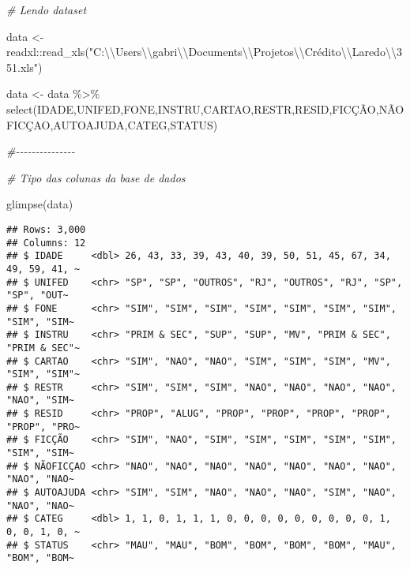 \documentclass[
]{book}
\newenvironment{Shaded}{\begin{snugshade}}{\end{snugshade}}
\newcommand{\CommentTok}[1]{\textcolor[rgb]{0.56,0.35,0.01}{\textit{#1}}}
\newcommand{\FunctionTok}[1]{\textcolor[rgb]{0.00,0.00,0.00}{#1}}
\newcommand{\NormalTok}[1]{#1}
\newcommand{\OtherTok}[1]{\textcolor[rgb]{0.56,0.35,0.01}{#1}}
\newcommand{\SpecialCharTok}[1]{\textcolor[rgb]{0.00,0.00,0.00}{#1}}
\newcommand{\StringTok}[1]{\textcolor[rgb]{0.31,0.60,0.02}{#1}}
\begin{document}
\begin{Shaded}
\begin{Highlighting}[]
\CommentTok{\# Lendo dataset}

\NormalTok{data }\OtherTok{\textless{}{-}}\NormalTok{ readxl}\SpecialCharTok{::}\FunctionTok{read\_xls}\NormalTok{(}\StringTok{"C:}\SpecialCharTok{\textbackslash{}\textbackslash{}}\StringTok{Users}\SpecialCharTok{\textbackslash{}\textbackslash{}}\StringTok{gabri}\SpecialCharTok{\textbackslash{}\textbackslash{}}\StringTok{Documents}\SpecialCharTok{\textbackslash{}\textbackslash{}}\StringTok{Projetos}\SpecialCharTok{\textbackslash{}\textbackslash{}}\StringTok{Crédito}\SpecialCharTok{\textbackslash{}\textbackslash{}}\StringTok{Laredo}\SpecialCharTok{\textbackslash{}\textbackslash{}}\StringTok{351.xls"}\NormalTok{)}

\NormalTok{data }\OtherTok{\textless{}{-}}\NormalTok{ data }\SpecialCharTok{\%\textgreater{}\%}
\FunctionTok{select}\NormalTok{(IDADE,UNIFED,FONE,INSTRU,CARTAO,RESTR,RESID,FICÇÃO,NÃOFICÇAO,AUTOAJUDA,CATEG,STATUS)}

\CommentTok{\#{-}{-}{-}{-}{-}{-}{-}{-}{-}{-}{-}{-}{-}{-}{-}}

\CommentTok{\# Tipo das colunas da base de dados}

\FunctionTok{glimpse}\NormalTok{(data)}
\end{Highlighting}
\end{Shaded}

\begin{verbatim}
## Rows: 3,000
## Columns: 12
## $ IDADE     <dbl> 26, 43, 33, 39, 43, 40, 39, 50, 51, 45, 67, 34, 49, 59, 41, ~
## $ UNIFED    <chr> "SP", "SP", "OUTROS", "RJ", "OUTROS", "RJ", "SP", "SP", "OUT~
## $ FONE      <chr> "SIM", "SIM", "SIM", "SIM", "SIM", "SIM", "SIM", "SIM", "SIM~
## $ INSTRU    <chr> "PRIM & SEC", "SUP", "SUP", "MV", "PRIM & SEC", "PRIM & SEC"~
## $ CARTAO    <chr> "SIM", "NAO", "NAO", "SIM", "SIM", "SIM", "MV", "SIM", "SIM"~
## $ RESTR     <chr> "SIM", "SIM", "SIM", "NAO", "NAO", "NAO", "NAO", "NAO", "SIM~
## $ RESID     <chr> "PROP", "ALUG", "PROP", "PROP", "PROP", "PROP", "PROP", "PRO~
## $ FICÇÃO    <chr> "SIM", "NAO", "SIM", "SIM", "SIM", "SIM", "SIM", "SIM", "SIM~
## $ NÃOFICÇAO <chr> "NAO", "NAO", "NAO", "NAO", "NAO", "NAO", "NAO", "NAO", "NAO~
## $ AUTOAJUDA <chr> "SIM", "SIM", "NAO", "NAO", "NAO", "SIM", "NAO", "NAO", "NAO~
## $ CATEG     <dbl> 1, 1, 0, 1, 1, 1, 0, 0, 0, 0, 0, 0, 0, 0, 0, 1, 0, 0, 1, 0, ~
## $ STATUS    <chr> "MAU", "MAU", "BOM", "BOM", "BOM", "BOM", "MAU", "BOM", "BOM~
\end{verbatim}

  
\end{document}
